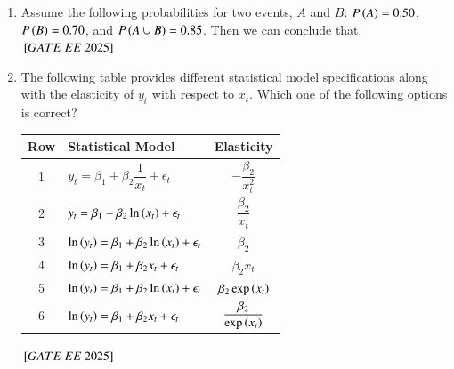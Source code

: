 \documentclass[journal,12pt,onecolumn]{IEEEtran}
\theoremstyle{remark}
\begin{document}
\begin{enumerate}
\item Assume the following probabilities for two events, $A$ and $B$: $P \left(A\right) = 0.50$, $P \left(B\right) = 0.70$, and $P \left(A \cup B\right) = 0.85$. Then we can conclude that
\hfill $\sbrak{GATE\ EE\ 2025}$
\begin{enumerate}
\end{enumerate}
 
\item The following table provides different statistical model specifications along with the elasticity of $y_t$ with respect to $x_t$. Which one of the following options is correct?

\begin{center}
\begin{tabular}{|c|l|c|}
\hline
Row & Statistical Model & Elasticity \\
\hline
1 & $y_t = \beta_1 + \beta_2 \dfrac{1}{x_t} + \epsilon_t$ & $-\dfrac{\beta_2}{x_t^2}$ \\
2 & $y_t = \beta_1 - \beta_2 \ln \left(x_t\right) + \epsilon_t$ & $\dfrac{\beta_2}{x_t}$ \\
3 & $\ln \left(y_t\right) = \beta_1 + \beta_2 \ln \left(x_t\right) + \epsilon_t $ & $\beta_2$ \\
4 & $\ln \left(y_t\right) = \beta_1 + \beta_2 x_t + \epsilon_t$ & $\beta_2 x_t$ \\
5 & $\ln \left(y_t\right) = \beta_1 + \beta_2 \ln \left(x_t\right) + \epsilon_t $ & $\beta_2 \exp \left(x_t\right)$ \\
6 & $\ln \left(y_t\right) = \beta_1 + \beta_2 x_t + \epsilon_t$ & $\dfrac{\beta_2}{\exp \left(x_t\right)}$ \\
\hline
\end{tabular}
\end{center}
\hfill $\sbrak{GATE\ EE\ 2025}$
\begin{enumerate}
\end{enumerate}
 

\end{enumerate}
\end{document}
